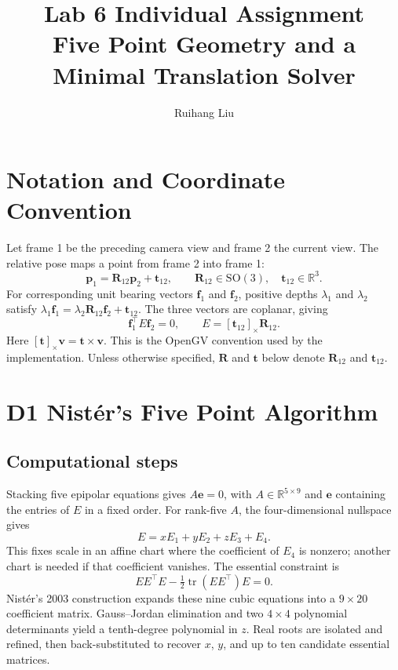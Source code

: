 \documentclass[10pt,a4paper,twocolumn]{article}
\title{Lab 6 Individual Assignment\\Five Point Geometry and a Minimal Translation Solver}
\author{Ruihang Liu}
\date{}
\newcommand{\skewm}[1]{[#1]_{\times}}
\newcommand{\R}{\mathbf R}
\newcommand{\ttt}{\mathbf t}
\newcommand{\ff}{\mathbf f}
\newcommand{\pp}{\mathbf p}
\begin{document}
\maketitle

\section*{Notation and Coordinate Convention}
Let frame 1 be the preceding camera view and frame 2 the current view. The relative pose maps a point from frame 2 into frame 1:
\begin{equation}
 \pp_1=\R_{12}\pp_2+\ttt_{12},\qquad
 \R_{12}\in\mathrm{SO}(3),\quad \ttt_{12}\in\mathbb R^3.
 \label{eq:map}
\end{equation}
For corresponding unit bearing vectors $\ff_1$ and $\ff_2$, positive depths $\lambda_1$ and $\lambda_2$ satisfy $\lambda_1\ff_1=\lambda_2\R_{12}\ff_2+\ttt_{12}$. The three vectors are coplanar, giving
\begin{equation}
 \ff_1^\top E\ff_2=0,\qquad E=\skewm{\ttt_{12}}\R_{12}.
 \label{eq:essential}
\end{equation}
Here $\skewm{\ttt}\mathbf v=\ttt\times\mathbf v$. This is the OpenGV convention used by the implementation. Unless otherwise specified, $\R$ and $\ttt$ below denote $\R_{12}$ and $\ttt_{12}$.

\section{D1 Nist\'er's Five Point Algorithm}
\subsection{Computational steps}
Stacking five epipolar equations gives $A\mathbf e=0$, with $A\in\mathbb R^{5\times9}$ and $\mathbf e$ containing the entries of $E$ in a fixed order. For rank-five $A$, the four-dimensional nullspace gives
\begin{equation}
 E=xE_1+yE_2+zE_3+E_4.
 \label{eq:nullspace}
\end{equation}
This fixes scale in an affine chart where the coefficient of $E_4$ is nonzero; another chart is needed if that coefficient vanishes. The essential constraint is
\begin{equation}
 EE^\top E-\tfrac12\operatorname{tr}(EE^\top)E=0.
 \label{eq:cubic}
\end{equation}
Nist\'er's 2003 construction \cite{nister2003efficient} expands these nine cubic equations into a $9\times20$ coefficient matrix. Gauss--Jordan elimination and two $4\times4$ polynomial determinants yield a tenth-degree polynomial in $z$. Real roots are isolated and refined, then back-substituted to recover $x$, $y$, and up to ten candidate essential matrices.
\end{document}
